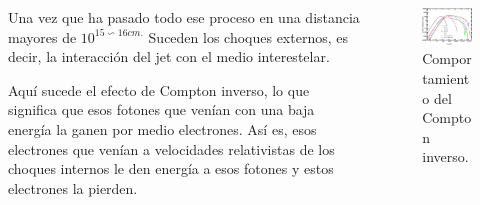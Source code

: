 \documentclass{beamer}
\begin{document}
		

\begin{frame}
	\begin{columns}
		\begin{column}{5cm}
		Una vez que ha pasado todo ese proceso
				en una distancia mayores de $10^{15 \backsim 16 cm.}$ Suceden los choques externos, es decir, la interacci\'on del jet con el medio interestelar.
				
				Aqu\'i sucede el efecto de Compton inverso, lo que significa que esos fotones que ven\'ian con una baja energ\'ia la ganen por medio electrones. Así es, esos electrones que ven\'ian a velocidades relativistas de los choques internos le den energ\'ia a esos fotones y estos electrones la pierden.
		
		\end{column}
		
		\begin{column}{5cm}
			\begin{figure}
				\centering
				\includegraphics[scale=0.25]{img69.jpg}
				\caption{Comportamiento del Compton inverso.}
			\end{figure}
		\end{column}	
	\end{columns}
\end{frame}


\end{document}
